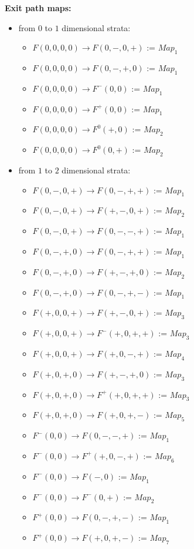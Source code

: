 \textbf{Exit path maps:}
\begin{itemize}
\item from $0$ to $1$ dimensional strata:
\begin{itemize}
\item $F(0,0,0,0)\rightarrow F(0,-,0,+)$ := $Map_1$
\item $F(0,0,0,0)\rightarrow F(0,-,+,0)$ := $Map_1$
\item $F(0,0,0,0)\rightarrow F^-(0,0)$ := $Map_1$
\item $F(0,0,0,0)\rightarrow F^+(0,0)$ := $Map_1$
\item $F(0,0,0,0)\rightarrow F^0(+,0)$ := $Map_2$
\item $F(0,0,0,0)\rightarrow F^0(0,+)$ := $Map_2$
\end{itemize}

\item from $1$ to $2$ dimensional strata:
\begin{itemize}
\item $F(0,-,0,+)\rightarrow F(0,-,+,+)$ := $Map_1$
\item $F(0,-,0,+)\rightarrow F(+,-,0,+)$ := $Map_2$
\item $F(0,-,0,+)\rightarrow F(0,-,-,+)$ := $Map_1$
\item $F(0,-,+,0)\rightarrow F(0,-,+,+)$ := $Map_1$
\item $F(0,-,+,0)\rightarrow F(+,-,+,0)$ := $Map_2$
\item $F(0,-,+,0)\rightarrow F(0,-,+,-)$ := $Map_1$
\item $F(+,0,0,+)\rightarrow F(+,-,0,+)$ := $Map_3$
\item $F(+,0,0,+)\rightarrow F^-(+,0,+,+)$ := $Map_3$
\item $F(+,0,0,+)\rightarrow F(+,0,-,+)$ := $Map_4$
\item $F(+,0,+,0)\rightarrow F(+,-,+,0)$ := $Map_3$
\item $F(+,0,+,0)\rightarrow F^+(+,0,+,+)$ := $Map_3$
\item $F(+,0,+,0)\rightarrow F(+,0,+,-)$ := $Map_5$
\item $F^-(0,0)\rightarrow F(0,-,-,+)$ := $Map_1$
\item $F^-(0,0)\rightarrow F^+(+,0,-,+)$ := $Map_6$
\item $F^-(0,0)\rightarrow F(-,0)$ := $Map_1$
\item $F^-(0,0)\rightarrow F^-(0,+)$ := $Map_2$
\item $F^+(0,0)\rightarrow F(0,-,+,-)$ := $Map_1$
\item $F^+(0,0)\rightarrow F(+,0,+,-)$ := $Map_7$

\end{itemize}
\end{itemize}
